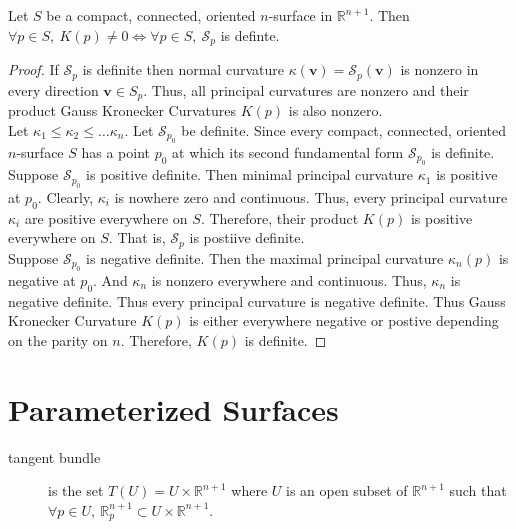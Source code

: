 \begin{theorem}
	Let $S$ be a compact, connected, oriented $n$-surface in $\mathbb{R}^{n+1}$. Then $\forall p \in S,\ K(p) \ne 0 \iff \forall p \in S,\ \mathscr{S}_p$ is definte.
\end{theorem}
\begin{proof}
	If $\mathscr{S}_p$ is definite then normal curvature $\kappa(\mathbf{v}) = \mathscr{S}_p(\mathbf{v})$ is nonzero in every direction $\mathbf{v} \in S_p$. Thus, all principal curvatures are nonzero and their product Gauss Kronecker Curvatures $K(p)$ is also nonzero.\\

	Let $\kappa_1 \le \kappa_2 \le \dots \kappa_n$. Let $\mathscr{S}_{p_0}$ be definite. Since every compact, connected, oriented $n$-surface $S$ has a point $p_0$ at which its second fundamental form $\mathscr{S}_{p_0}$ is definite. Suppose $\mathscr{S}_{p_0}$ is positive definite. Then minimal principal curvature $\kappa_1$ is positive at $p_0$. Clearly, $\kappa_i$ is nowhere zero and continuous. Thus, every principal curvature $\kappa_i$ are positive everywhere on $S$. Therefore, their product $K(p)$ is positive everywhere on $S$. That is, $\mathscr{S}_p$ is postiive definite.\\

	Suppose $\mathscr{S}_{p_0}$ is negative definite. Then the maximal principal curvature $\kappa_n(p)$ is negative at $p_0$. And $\kappa_n$ is nonzero everywhere and continuous. Thus, $\kappa_n$ is negative definite. Thus every principal curvature is negative definite. Thus Gauss Kronecker Curvature $K(p)$ is either everywhere negative or postive depending on the parity on $n$. Therefore, $K(p)$ is definite.
\end{proof}
\setcounter{section}{13}
\section{Parameterized Surfaces}
\begin{description}
	\item[tangent bundle] is the set $T(U) = U \times \mathbb{R}^{n+1}$ where $U$ is an open subset of $\mathbb{R}^{n+1}$ such that $\forall p \in U,\ \mathbb{R}_p^{n+1} \subset U \times \mathbb{R}^{n+1}$.
\end{description}

